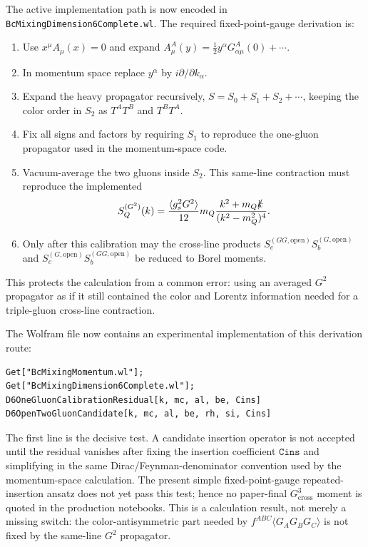 \documentclass[11pt]{article}
\begin{document}
The active implementation path is now encoded in
\texttt{BcMixingDimension6Complete.wl}.  The required fixed-point-gauge
derivation is:
\begin{enumerate}
  \item Use \(x^\mu A_\mu(x)=0\) and expand
  \(A_\mu^A(y)=\frac12 y^\alpha G_{\alpha\mu}^A(0)+\cdots\).
  \item In momentum space replace \(y^\alpha\) by \(i\partial/\partial k_\alpha\).
  \item Expand the heavy propagator recursively,
  \(S=S_0+S_1+S_2+\cdots\), keeping the color order in
  \(S_2\) as \(T^AT^B\) and \(T^BT^A\).
  \item Fix all signs and factors by requiring \(S_1\) to reproduce the
  one-gluon propagator used in the momentum-space code.
  \item Vacuum-average the two gluons inside \(S_2\).  This same-line
  contraction must reproduce the implemented
  \[
    S_Q^{(G^2)}(k)
    =
    \frac{\langle g_s^2G^2\rangle}{12}
    m_Q
    \frac{k^2+m_Q\slashed{k}}{(k^2-m_Q^2)^4}.
  \]
  \item Only after this calibration may the cross-line products
  \(S_c^{(GG,\mathrm{open})}S_b^{(G,\mathrm{open})}\) and
  \(S_c^{(G,\mathrm{open})}S_b^{(GG,\mathrm{open})}\) be reduced to Borel
  moments.
\end{enumerate}
This protects the calculation from a common error: using an averaged
\(G^2\) propagator as if it still contained the color and Lorentz information
needed for a triple-gluon cross-line contraction.

The Wolfram file now contains an experimental implementation of this derivation
route:
\begin{verbatim}
Get["BcMixingMomentum.wl"];
Get["BcMixingDimension6Complete.wl"];
D6OneGluonCalibrationResidual[k, mc, al, be, Cins]
D6OpenTwoGluonCandidate[k, mc, al, be, rh, si, Cins]
\end{verbatim}
The first line is the decisive test.  A candidate insertion operator is not
accepted until the residual vanishes after fixing the insertion coefficient
\(\texttt{Cins}\) and simplifying in the same Dirac/Feynman-denominator
convention used by the momentum-space calculation.  The present simple
fixed-point-gauge repeated-insertion ansatz does not yet pass this test; hence
no paper-final \(G^3_{\mathrm{cross}}\) moment is quoted in the production
notebooks.  This is a calculation result, not merely a missing switch: the
color-antisymmetric part needed by \(f^{ABC}\langle G_AG_BG_C\rangle\) is not
fixed by the same-line \(G^2\) propagator.
\end{document}
